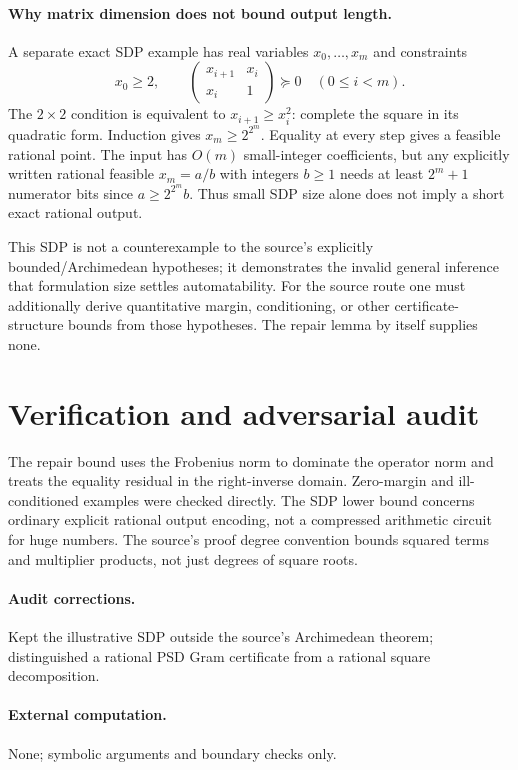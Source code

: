 \documentclass[11pt]{article}
\begin{document}
\paragraph{Why matrix dimension does not bound output length.}
A separate exact SDP example has real variables $x_0,\ldots,x_m$ and constraints
\[
x_0\geq2,\qquad
\begin{pmatrix}x_{i+1}&x_i\\x_i&1\end{pmatrix}\succeq0
\quad(0\leq i<m).
\]
The $2\times2$ condition is equivalent to $x_{i+1}\geq x_i^2$: complete the square in its quadratic form. Induction gives $x_m\geq2^{2^m}$. Equality at every step gives a feasible rational point. The input has $O(m)$ small-integer coefficients, but any explicitly written rational feasible $x_m=a/b$ with integers $b\geq1$ needs at least $2^m+1$ numerator bits since $a\geq2^{2^m}b$. Thus small SDP size alone does not imply a short exact rational output.

This SDP is not a counterexample to the source's explicitly bounded/Archimedean hypotheses; it demonstrates the invalid general inference that formulation size settles automatability. For the source route one must additionally derive quantitative margin, conditioning, or other certificate-structure bounds from those hypotheses. The repair lemma by itself supplies none.
\section{Verification and adversarial audit}
The repair bound uses the Frobenius norm to dominate the operator norm and treats the equality residual in the right-inverse domain. Zero-margin and ill-conditioned examples were checked directly. The SDP lower bound concerns ordinary explicit rational output encoding, not a compressed arithmetic circuit for huge numbers. The source's proof degree convention bounds squared terms and multiplier products, not just degrees of square roots.
\paragraph{Audit corrections.} Kept the illustrative SDP outside the source's Archimedean theorem; distinguished a rational PSD Gram certificate from a rational square decomposition.
\paragraph{External computation.} None; symbolic arguments and boundary checks only.
\end{document}
